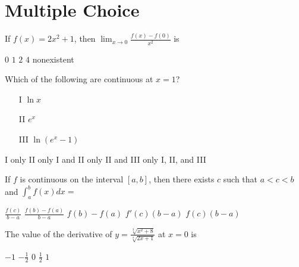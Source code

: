 \section{Multiple Choice}
\begin{questions}       

\question[2] If $f(x) = 2x^2 + 1$, then $\lim_{x \to 0} \frac{f(x) -
    f(0)}{x^2}$ is
    
    \begin{oneparchoices}
    \choice $0$
    \choice $1$
    \CorrectChoice $2$
    \choice $4$
    \choice nonexistent
    \end{oneparchoices}


\question[2] Which of the following are continuous at $x = 1$?
    \begin{enumerate}
    \item[I] $\ln x$
    \item[II] $e^{x}$
    \item[III] $\ln(e^{x} - 1)$
    \end{enumerate}

    \begin{oneparchoices}
    \choice I only
    \choice II only
    \choice I and II only
    \choice II and III only
    \CorrectChoice I, II, and III
    \end{oneparchoices}


\question[2] If $f$ is continuous on the interval $[a, b]$, then there
    exists $c$ such that $a < c< b$ and $\int_a^b f(x)dx = $

    \begin{oneparchoices}
    \choice $\frac{f(c)}{b - a}$
    \choice $\frac{f(b) - f(a)}{b - a}$
    \choice $f(b) - f(a)$
    \choice $f'(c)(b - a)$
    \CorrectChoice $f(c)(b - a)$
    \end{oneparchoices}

\question[2] The value of the derivative of $y = \frac{\sqrt[3]{x^2 +
    8}}{\sqrt[4]{2x + 1}}$ at $x = 0$ is

    \begin{oneparchoices}
    \CorrectChoice $-1$
    \choice $-\frac{1}{2}$
    \choice $0$
    \choice $\frac{1}{2}$
    \choice $1$
    \end{oneparchoices}


\end{questions}
